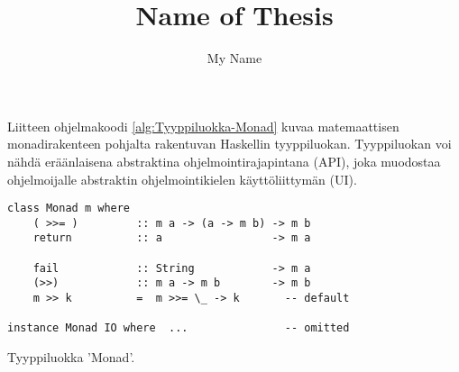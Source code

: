 \documentclass[language=finnish,version=final,mainfont=none,sharelatex=false]{utuftthesis}
\providecommand{\algorithmname}{Algoritmi}
\begin{document}
\title{Name of Thesis}
\author{My Name}

\maketitle


\tableofcontents

\listoffigures

\listoftables

\listofacronyms

\renewcommand{\algorithmname}{\listingscaption}


\begin{comment}
To better organize things, create a new tex file for each chapter
and input it below.

Avoid using the å, ä, ö or <space> characters in referred names and
underscores \_ in file names (may break hyperref).

Good luck!
\end{comment}

%
%


\printbibliography

\begin{comment}
Important! Create the appendix chapters with command \textbackslash appchapter\{some
name\} instead of \textbackslash chapter\{some name\} for the automagic
page counting to work!
\end{comment}



Liitteen ohjelmakoodi \ref{alg:Tyyppiluokka-Monad} kuvaa matemaattisen
monadirakenteen pohjalta rakentuvan Haskellin tyyppiluokan. Tyyppiluokan
voi nähdä eräänlaisena abstraktina ohjelmointirajapintana (API),
joka muodostaa ohjelmoijalle abstraktin ohjelmointikielen käyttöliittymän
(UI).

\begin{algorithm}[tbh]
\begin{verbatim}
class Monad m where
    ( >>= )         :: m a -> (a -> m b) -> m b
    return          :: a                 -> m a

    fail            :: String            -> m a
    (>>)            :: m a -> m b        -> m b
    m >> k          =  m >>= \_ -> k       -- default

instance Monad IO where  ...               -- omitted
\end{verbatim}

\caption{Tyyppiluokka 'Monad'.\label{alg:Tyyppiluokka-Monad}}
\end{algorithm}
\end{document}

